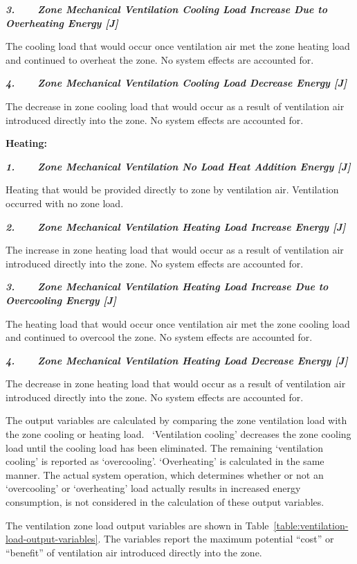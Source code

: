 \textbf{\emph{3.~~~~Zone Mechanical Ventilation Cooling Load Increase Due to Overheating Energy {[}J{]}}}

The cooling load that would occur once ventilation air met the zone heating load and continued to overheat the zone. No system effects are accounted for.

\textbf{\emph{4.~~~~Zone Mechanical Ventilation Cooling Load Decrease Energy {[}J{]}}}

The decrease in zone cooling load that would occur as a result of ventilation air introduced directly into the zone. No system effects are accounted for.

\textbf{Heating:}

\textbf{\emph{1.~~~~Zone Mechanical Ventilation No Load Heat Addition Energy {[}J{]}}}

Heating that would be provided directly to zone by ventilation air. Ventilation occurred with no zone load.

\textbf{\emph{2.~~~~Zone Mechanical Ventilation Heating Load Increase Energy {[}J{]}}}

The increase in zone heating load that would occur as a result of ventilation air introduced directly into the zone. No system effects are accounted for.

\textbf{\emph{3.~~~~Zone Mechanical Ventilation Heating Load Increase Due to Overcooling Energy {[}J{]}}}

The heating load that would occur once ventilation air met the zone cooling load and continued to overcool the zone. No system effects are accounted for.

\textbf{\emph{4.~~~~Zone Mechanical Ventilation Heating Load Decrease Energy {[}J{]}}}

The decrease in zone heating load that would occur as a result of ventilation air introduced directly into the zone. No system effects are accounted for.

The output variables are calculated by comparing the zone ventilation load with the zone cooling or heating load.~ `Ventilation cooling' decreases the zone cooling load until the cooling load has been eliminated. The remaining `ventilation cooling' is reported as `overcooling'. `Overheating' is calculated in the same manner. The actual system operation, which determines whether or not an `overcooling' or `overheating' load actually results in increased energy consumption, is not considered in the calculation of these output variables.

The ventilation zone load output variables are shown in Table~\ref{table:ventilation-load-output-variables}. The variables report the maximum potential ``cost'' or ``benefit'' of ventilation air introduced directly into the zone.

